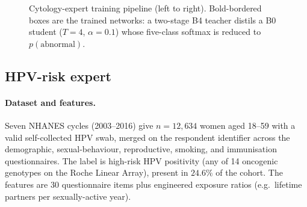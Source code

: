 \documentclass[sigplan,nonacm,screen]{acmart}
\begin{document}
\begin{figure}[t]\centering
{}
\caption{Cytology-expert training pipeline (left to right). Bold-bordered boxes are the trained networks: a
two-stage B4 teacher distils a B0 student ($T=4$, $\alpha=0.1$) whose five-class softmax is reduced to
$p(\text{abnormal})$.}
\label{fig:imgpipe}
\end{figure}

\subsection{HPV-risk expert}\label{sec:tabmethod}
\paragraph{Dataset and features.} Seven NHANES cycles (2003--2016) give $n=12{,}634$ women aged 18--59 with a
valid self-collected HPV swab, merged on the respondent identifier across the demographic, sexual-behaviour,
reproductive, smoking, and immunisation questionnaires. The label is high-risk HPV positivity (any of 14
oncogenic genotypes on the Roche Linear Array), present in $24.6\%$ of the cohort. The features are $30$
questionnaire items plus engineered exposure ratios (e.g.\ lifetime partners per sexually-active year).
\end{document}

